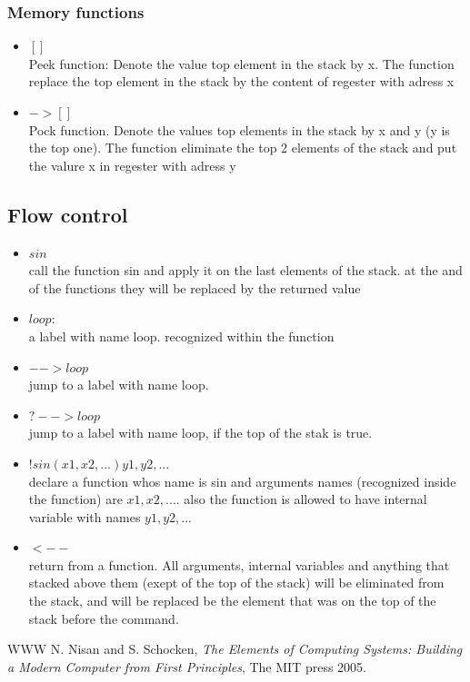 \documentclass[12pt]{amsart}
\begin{document}
\subsubsection{Memory functions}		
\begin{itemize}	
\item				$[]$\\
			Peek function: Denote the value top element in the stack by x. The function replace the top element in the stack by the content of regester with adress x 

\item				$->[]$\\
			Pock function. Denote the values top elements in the stack by x and y (y is the top one). The function eliminate the top 2 elements of the stack and put the valure x in regester with adress y
			
\end{itemize}	


\subsection{Flow control}	
\begin{itemize}	
			
\item				$sin$\\
	call the function sin and apply it on the last elements of the stack. at the and of the functions they will be replaced by the returned value

\item					$loop:$\\
	a label with name loop. recognized within the function

\item					$--> loop$\\
	jump to a label with name loop. 

\item					$? --> loop$\\
	jump to a label with name loop, if the top of the stak is true. 


\item					$! sin(x1,x2,...) y1,y2,...$\\
	declare a function whos name is sin and arguments names (recognized inside the function) are $x1,x2,....$ also the function is allowed to have internal variable with names $y1,y2,...$

\item					$<--$\\
	return from a function. All arguments, internal variables and anything that stacked above them (exept of the top of the stack) will be eliminated from the stack, and will be replaced be the element that was on the top of the stack before the command.
	
\end{itemize}	


\begin{thebibliography}{WWW}
 N. Nisan and S. Schocken, {\it The Elements of Computing Systems: Building a Modern Computer from First Principles}, The MIT press 2005.
\end{thebibliography}
\end{document}
